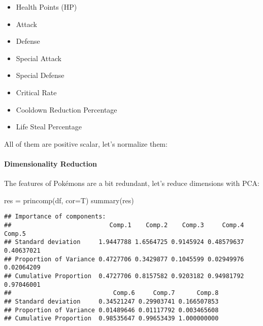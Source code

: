 \documentclass[
]{article}
\newenvironment{Shaded}{\begin{snugshade}}{\end{snugshade}}
\newcommand{\AttributeTok}[1]{\textcolor[rgb]{0.77,0.63,0.00}{#1}}
\newcommand{\ConstantTok}[1]{\textcolor[rgb]{0.00,0.00,0.00}{#1}}
\newcommand{\ControlFlowTok}[1]{\textcolor[rgb]{0.13,0.29,0.53}{\textbf{#1}}}
\newcommand{\DecValTok}[1]{\textcolor[rgb]{0.00,0.00,0.81}{#1}}
\newcommand{\FunctionTok}[1]{\textcolor[rgb]{0.00,0.00,0.00}{#1}}
\newcommand{\NormalTok}[1]{#1}
\newcommand{\OtherTok}[1]{\textcolor[rgb]{0.56,0.35,0.01}{#1}}
\newcommand{\SpecialCharTok}[1]{\textcolor[rgb]{0.00,0.00,0.00}{#1}}
\providecommand{\tightlist}{%
  \setlength{\itemsep}{0pt}\setlength{\parskip}{0pt}}
\begin{document}
\begin{itemize}
\tightlist
\item
  Health Points (HP)
\item
  Attack
\item
  Defense
\item
  Special Attack
\item
  Special Defense
\item
  Critical Rate
\item
  Cooldown Reduction Percentage
\item
  Life Steal Percentage
\end{itemize}

All of them are positive scalar, let's normalize them:

\begin{Shaded}
\end{Shaded}

\hypertarget{dimensionality-reduction}{%
\paragraph{Dimensionality Reduction}\label{dimensionality-reduction}}

The features of Pokémons are a bit redundant, let's reduce dimensions
with PCA:

\begin{Shaded}
\begin{Highlighting}[]
\NormalTok{res }\OtherTok{=} \FunctionTok{princomp}\NormalTok{(df, }\AttributeTok{cor=}\NormalTok{T)}
\FunctionTok{summary}\NormalTok{(res)}
\end{Highlighting}
\end{Shaded}

\begin{verbatim}
## Importance of components:
##                           Comp.1    Comp.2    Comp.3     Comp.4     Comp.5
## Standard deviation     1.9447788 1.6564725 0.9145924 0.48579637 0.40637021
## Proportion of Variance 0.4727706 0.3429877 0.1045599 0.02949976 0.02064209
## Cumulative Proportion  0.4727706 0.8157582 0.9203182 0.94981792 0.97046001
##                            Comp.6     Comp.7      Comp.8
## Standard deviation     0.34521247 0.29903741 0.166507853
## Proportion of Variance 0.01489646 0.01117792 0.003465608
## Cumulative Proportion  0.98535647 0.99653439 1.000000000
\end{verbatim}
\end{document}
